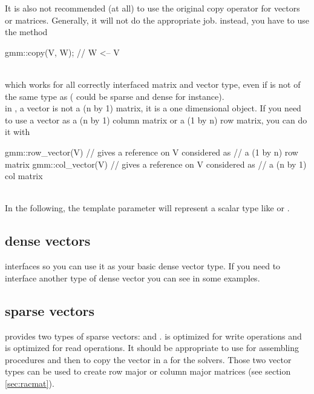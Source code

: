 \documentclass[11pt,a4paper]{article}
\begin{document}
It is also not recommended (at all) to use the original copy operator for vectors or matrices. Generally, it will not do the appropriate job. instead, you have to use the method \\[0.2cm]
\begin{cppcode}
  gmm::copy(V, W);  //  W <-- V
\end{cppcode}$\;$\\[0.2cm]
which works for all correctly interfaced matrix and vector type, even if  is not of the same type as  ( could be sparse and  dense for instance). \\[0.2cm]

in \gmm, a vector is not a (n by 1) matrix, it is a one dimensional object. If you need to use a vector as a (n by 1) column matrix or a (1 by n) row matrix, you can do it with
\begin{cppcode}
   gmm::row_vector(V) // gives a reference on V considered as
                      // a (1 by n) row matrix
   gmm::col_vector(V) // gives a reference on V considered as
                      // a (n by 1) col matrix
\end{cppcode}$\;$\\[0.2cm]

In the following, the template parameter  will represent a scalar type like  or .


\subsection{dense vectors}
\gmm interfaces  so you can use it as your basic dense vector type.
If you need to interface another type of dense vector you can see in 
some examples.
\subsection{sparse vectors}
\gmm provides two types of sparse vectors:  and .  is optimized for write operations and  is optimized for read operations. It should be appropriate to use  for assembling procedures and then to copy the vector in a  for the solvers. Those two vector types can be used to create row major or column major matrices (see section \ref{sec:racmat}).
\end{document}
